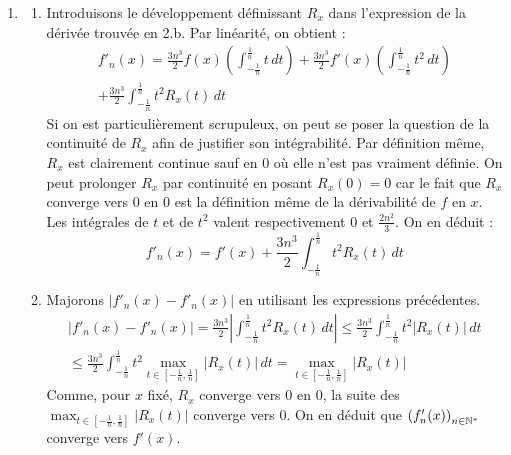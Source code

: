 \begin{enumerate}
\begin{enumerate}
\end{enumerate}
\item \begin{enumerate}
 \item Introduisons le développement définissant $R_x$ dans l'expression de la dérivée trouvée en 2.b. Par linéarité, on obtient :
\begin{multline*}
 f'_n(x)=\frac{3n^3}{2}f(x)\left( \int_{-\frac{1}{n}}^{\frac{1}{n}}t\,dt \right) 
+\frac{3n^3}{2}f'(x)\left( \int_{-\frac{1}{n}}^{\frac{1}{n}}t^2\,dt\right)  \\
+\frac{3n^3}{2}\int_{-\frac{1}{n}}^{\frac{1}{n}}t^2R_x(t)\,dt
\end{multline*}
 Si on est particulièrement scrupuleux, on peut se poser la question de la continuité de $R_x$ afin de justifier son intégrabilité. Par définition même, $R_x$ est clairement continue sauf en $0$ où elle n'est pas vraiment définie. On peut prolonger $R_x$ par continuité en posant $R_x(0)=0$ car le fait que $R_x$ converge vers $0$ en $0$ est la définition même de la dérivabilité de $f$ en $x$.\newline
Les intégrales de $t$ et de $t^2$ valent respectivement $0$ et $\frac{2n^2}{3}$. On en déduit :
\begin{displaymath}
 f'_n(x) = f'(x) + \frac{3n^3}{2}\int_{-\frac{1}{n}}^{\frac{1}{n}}t^2R_x(t)\,dt
\end{displaymath}
\item Majorons $|f'_n(x)-f'_n(x)|$ en utilisant les expressions précédentes.
\begin{multline*}
 \left\vert f'_n(x)-f'_n(x) \right \vert 
= \frac{3n^3}{2}\left \vert  \int_{-\frac{1}{n}}^{\frac{1}{n}}t^2R_x(t)\,dt \right\vert
\leq \frac{3n^3}{2} \int_{-\frac{1}{n}}^{\frac{1}{n}}t^2\left\vert R_x(t) \right \vert \,dt \\
\leq \frac{3n^3}{2} \int_{-\frac{1}{n}}^{\frac{1}{n}}t^2 \max_{t\in[-\frac{1}{n},\frac{1}{n}]}|R_x(t)| \,dt = \max_{t\in[-\frac{1}{n},\frac{1}{n}]}|R_x(t)|
\end{multline*}
Comme, pour $x$ fixé, $R_x$ converge vers $0$ en $0$, la suite des $\max_{t\in[-\frac{1}{n},\frac{1}{n}]}|R_x(t)|$ converge vers $0$. On en déduit que $\left(f_n'(x) \right)_{n\in\mathbb{N}^*}$ converge vers $f'(x)$.
\end{enumerate}
\end{enumerate}
